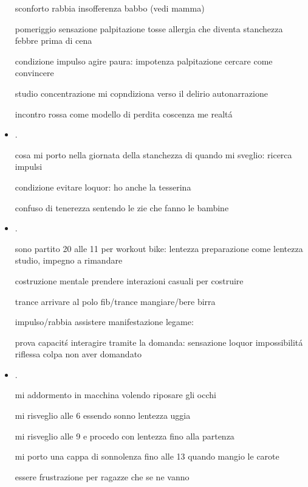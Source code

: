 \begin{itemize}
sconforto rabbia insofferenza babbo (vedi mamma)

pomeriggio sensazione palpitazione tosse allergia che diventa stanchezza febbre prima di cena

condizione impulso agire paura: impotenza palpitazione cercare come convincere 

studio concentrazione mi copndiziona verso il delirio autonarrazione

incontro rossa come modello di perdita coscenza me realt\'a


\item {}.

cosa mi porto nella giornata della stanchezza di quando mi sveglio: ricerca impulsi

condizione evitare loquor: ho anche la tesserina

confuso di tenerezza sentendo le zie che fanno le bambine

\item {}.

sono partito 20 alle 11 per workout bike: lentezza preparazione come lentezza studio, impegno a rimandare

costruzione mentale prendere interazioni casuali per costruire 

trance arrivare al polo fib/trance mangiare/bere birra

impulso/rabbia assistere manifestazione legame: 

prova capacit\'s interagire tramite la domanda: sensazione loquor impossibilit\'a riflessa colpa non aver domandato

\item {}.

mi addormento in macchina volendo riposare gli occhi

mi risveglio alle 6 essendo sonno lentezza uggia

mi risveglio alle 9 e procedo con lentezza fino alla partenza

mi porto una cappa di sonnolenza fino alle 13 quando mangio le carote

essere frustrazione per ragazze che se ne vanno 



\end{itemize}
